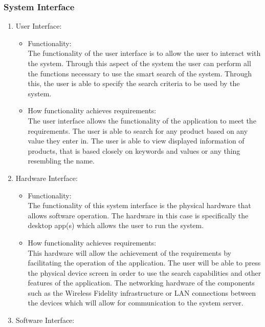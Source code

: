 \documentclass[a4paper,10pt]{article}
\begin{document}
        \subsubsection{System Interface}{
			\begin{enumerate} 
				\item User Interface:
					\begin{itemize}
				\item Functionality:\\
					The functionality of the user interface is to allow the user to interact with the system. Through this aspect of the system the user can perform all the functions necessary to use the smart search of the system. Through this, the user is able to specify the search criteria to be used by the system.\\
				\item How functionality achieves requirements:\\	
					The user interface allows the functionality of the application to meet the requirements. The user is able to search for any product based on any value they enter in. The user is able to view displayed information of products, that is based closely on keywords and values or any thing resembling the name. \\
					\end{itemize}
				\item Hardware Interface:
					\begin{itemize}
					\item Functionality:\\
					The functionality of this system interface is the physical hardware that allows software operation. The hardware in this case is specifically the desktop app(s) which allows the user to run the system.\\
				\item How functionality achieves requirements:\\
					This hardware will allow the achievement of the requirements by facilitating the operation of the application. The user will be able to press the physical device screen in order to use the search capabilities and other features of the application. The networking hardware of the components such as the Wireless Fidelity infrastructure or LAN connections between the devices which will allow for communication to the system server.
				\end{itemize}
				\item Software Interface:
					\begin{itemize}

\end{itemize}
\end{enumerate}}
\end{document}
